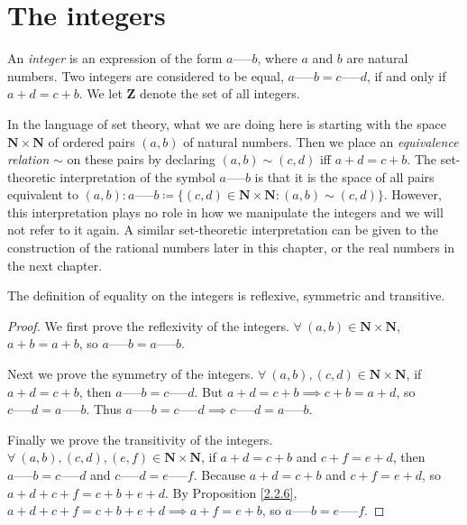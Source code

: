 \section{The integers}\label{sec 4.1}

\begin{definition}[Integers]\label{4.1.1}
    An \emph{integer} is an expression of the form \(a \text{-----} b\), where \(a\) and \(b\) are natural numbers.
    Two integers are considered to be equal, \(a \text{-----} b = c \text{-----} d\), if and only if \(a + d = c + b\).
    We let \(\mathbf{Z}\) denote the set of all integers.
\end{definition}

\begin{note}
    In the language of set theory, what we are doing here is starting with the space \(\mathbf{N} \times \mathbf{N}\) of ordered pairs \((a, b)\) of natural numbers.
    Then we place an \emph{equivalence relation} \(\sim\) on these pairs by declaring \((a, b) \sim (c, d)\) iff \(a + d = c + b\).
    The set-theoretic interpretation of the symbol \(a \text{-----} b\) is that it is the space of all pairs equivalent to \((a, b): a \text{-----} b \coloneqq \{(c, d) \in \mathbf{N} \times \mathbf{N} : (a, b) \sim (c, d)\}\).
    However, this interpretation plays no role in how we manipulate the integers and we will not refer to it again.
    A similar set-theoretic interpretation can be given to the construction of the rational numbers later in this chapter, or the real numbers in the next chapter.
\end{note}

\begin{additional corollary}\label{ac 4.1.1}
The definition of equality on the integers is reflexive, symmetric and transitive.
\end{additional corollary}

\begin{proof}
    We first prove the reflexivity of the integers.
    \(\forall\ (a, b) \in \mathbf{N} \times \mathbf{N}\), \(a + b = a + b\), so \(a \text{-----} b = a \text{-----} b\).

    Next we prove the symmetry of the integers.
    \(\forall\ (a, b), (c, d) \in \mathbf{N} \times \mathbf{N}\), if \(a + d = c + b\), then \(a \text{-----} b = c \text{-----} d\).
    But \(a + d = c + b \implies c + b = a + d\), so \(c \text{-----} d = a \text{-----} b\).
    Thus \(a \text{-----} b = c \text{-----} d \implies c \text{-----} d = a \text{-----} b\).

    Finally we prove the transitivity of the integers.
    \(\forall\ (a, b), (c, d), (e, f) \in \mathbf{N} \times \mathbf{N}\), if \(a + d = c + b\) and \(c + f = e + d\), then \(a \text{-----} b = c \text{-----} d\) and \(c \text{-----} d = e \text{-----} f\).
    Because \(a + d = c + b\) and \(c + f = e + d\), so \(a + d + c + f = c + b + e + d\).
    By Proposition \ref{2.2.6}, \(a + d + c + f = c + b + e + d \implies a + f = e + b\), so \(a \text{-----} b = e \text{-----} f\).
\end{proof}

